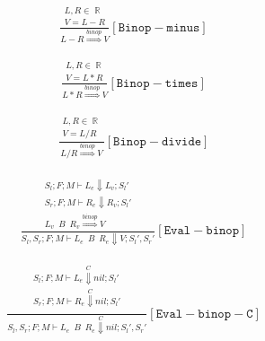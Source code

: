 \documentclass{scrartcl}
\DeclareMathOperator{\numtype}{\mathbb{R}}
\begin{document}
    \begin{align*}
    \frac{
        \begin{matrix}
        L, R \in \numtype \\
        V = L - R
        \end{matrix}
    }{
        L - R \overset{binop}{\Rightarrow} V
    }[\mathtt{Binop-minus}]
    \end{align*}
    
    \begin{align*}
    \frac{
        \begin{matrix}
        L, R \in \numtype \\
        V = L * R
        \end{matrix}
    }{
        L * R \overset{binop}{\Rightarrow} V
    }[\mathtt{Binop-times}]
    \end{align*}
    
    \begin{align*}
    \frac{
        \begin{matrix}
        L, R \in \numtype \\
        V = L / R
        \end{matrix}
    }{
        L / R \overset{binop}{\Rightarrow} V
    }[\mathtt{Binop-divide}]
    \end{align*}
    
    \begin{align*}
    \frac{
        \begin{matrix}
        S_l; F; M \vdash L_e \Downarrow L_v; S_l' \\
        S_r; F; M \vdash R_e \Downarrow R_v; S_l' \\
        L_v \enspace B \enspace R_v \overset{binop}{\Rightarrow} V
        \end{matrix}
    }{
        S_l, S_r; F; M \vdash L_e \enspace B \enspace R_e \Downarrow V; S_l', S_r'
    }[\mathtt{Eval-binop}]
    \end{align*}
    
    \begin{align*}
    \frac{
        \begin{matrix}
        S_l; F; M \vdash L_e \overset{C}{\Downarrow} nil; S_l' \\
        S_r; F; M \vdash R_e \overset{C}{\Downarrow} nil; S_l' \\
        \end{matrix}
    }{
        S_l, S_r; F; M \vdash L_e \enspace B \enspace R_e \overset{C}{\Downarrow} nil; S_l', S_r'
    }[\mathtt{Eval-binop-C}]
    \end{align*}
    
\end{document}
